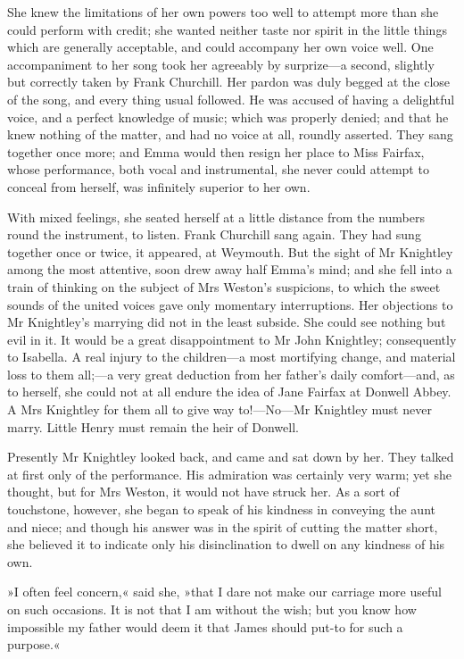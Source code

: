 She knew the limitations of her own powers too well to attempt more than she could perform with credit; she wanted neither taste nor spirit in the little things which are generally acceptable, and could accompany her own voice well. One accompaniment to her song took her agreeably by surprize—a second, slightly but correctly taken by Frank Churchill. Her pardon was duly begged at the close of the song, and every thing usual followed. He was accused of having a delightful voice, and a perfect knowledge of music; which was properly denied; and that he knew nothing of the matter, and had no voice at all, roundly asserted. They sang together once more; and Emma would then resign her place to Miss Fairfax, whose performance, both vocal and instrumental, she never could attempt to conceal from herself, was infinitely superior to her own.

With mixed feelings, she seated herself at a little distance from the numbers round the instrument, to listen. Frank Churchill sang again. They had sung together once or twice, it appeared, at Weymouth. But the sight of Mr Knightley among the most attentive, soon drew away half Emma's mind; and she fell into a train of thinking on the subject of Mrs Weston's suspicions, to which the sweet sounds of the united voices gave only momentary interruptions. Her objections to Mr Knightley's marrying did not in the least subside. She could see nothing but evil in it. It would be a great disappointment to Mr John Knightley; consequently to Isabella. A real injury to the children—a most mortifying change, and material loss to them all;—a very great deduction from her father's daily comfort—and, as to herself, she could not at all endure the idea of Jane Fairfax at Donwell Abbey. A Mrs Knightley for them all to give way to!—No—Mr Knightley must never marry. Little Henry must remain the heir of Donwell.

Presently Mr Knightley looked back, and came and sat down by her. They talked at first only of the performance. His admiration was certainly very warm; yet she thought, but for Mrs Weston, it would not have struck her. As a sort of touchstone, however, she began to speak of his kindness in conveying the aunt and niece; and though his answer was in the spirit of cutting the matter short, she believed it to indicate only his disinclination to dwell on any kindness of his own.

»I often feel concern,« said she, »that I dare not make our carriage more useful on such occasions. It is not that I am without the wish; but you know how impossible my father would deem it that James should put-to for such a purpose.«

